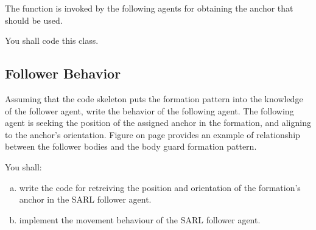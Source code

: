 \documentclass[article,english,nodocumentinfo]{multiagentfrreport}
\begin{document}
The function  is invoked by the following agents for obtaining the anchor that should be used.

You shall code this class.

\subsection{Follower Behavior}

Assuming that the code skeleton puts the formation pattern into the knowledge of the follower agent, write the behavior of the following agent.
The following agent is seeking the position of the assigned anchor in the formation, and aligning to the anchor's orientation.
Figure  on page  provides an example of relationship between the follower bodies and the body guard formation pattern.

You shall:
\begin{enumerate}[a)]
\item write the code for retreiving the position and orientation of the formation's anchor in the SARL follower agent.
\item implement the movement behaviour of the SARL follower agent.
\end{enumerate}
\end{document}
